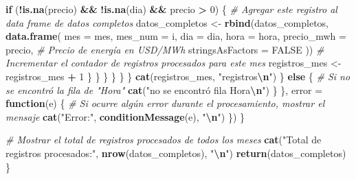 \documentclass[
]{article}
\newenvironment{Shaded}{\begin{snugshade}}{\end{snugshade}}
\newcommand{\AttributeTok}[1]{\textcolor[rgb]{0.13,0.29,0.53}{#1}}
\newcommand{\CommentTok}[1]{\textcolor[rgb]{0.56,0.35,0.01}{\textit{#1}}}
\newcommand{\ConstantTok}[1]{\textcolor[rgb]{0.56,0.35,0.01}{#1}}
\newcommand{\ControlFlowTok}[1]{\textcolor[rgb]{0.13,0.29,0.53}{\textbf{#1}}}
\newcommand{\DecValTok}[1]{\textcolor[rgb]{0.00,0.00,0.81}{#1}}
\newcommand{\FunctionTok}[1]{\textcolor[rgb]{0.13,0.29,0.53}{\textbf{#1}}}
\newcommand{\NormalTok}[1]{#1}
\newcommand{\OtherTok}[1]{\textcolor[rgb]{0.56,0.35,0.01}{#1}}
\newcommand{\SpecialCharTok}[1]{\textcolor[rgb]{0.81,0.36,0.00}{\textbf{#1}}}
\newcommand{\StringTok}[1]{\textcolor[rgb]{0.31,0.60,0.02}{#1}}
\begin{document}
\begin{Shaded}
\begin{Highlighting}[]
                  \ControlFlowTok{if}\NormalTok{ (}\SpecialCharTok{!}\FunctionTok{is.na}\NormalTok{(precio) }\SpecialCharTok{\&\&} \SpecialCharTok{!}\FunctionTok{is.na}\NormalTok{(dia) }\SpecialCharTok{\&\&}\NormalTok{ precio }\SpecialCharTok{\textgreater{}} \DecValTok{0}\NormalTok{) \{}
                    \CommentTok{\# Agregar este registro al data frame de datos completos}
\NormalTok{                    datos\_completos }\OtherTok{\textless{}{-}} \FunctionTok{rbind}\NormalTok{(datos\_completos, }\FunctionTok{data.frame}\NormalTok{(}
                      \AttributeTok{mes =}\NormalTok{ mes,              }
                      \AttributeTok{mes\_num =}\NormalTok{ i,            }
                      \AttributeTok{dia =}\NormalTok{ dia,              }
                      \AttributeTok{hora =}\NormalTok{ hora,            }
                      \AttributeTok{precio\_mwh =}\NormalTok{ precio,    }\CommentTok{\# Precio de energía en USD/MWh}
                      \AttributeTok{stringsAsFactors =} \ConstantTok{FALSE} 
\NormalTok{                    ))}
                    \CommentTok{\# Incrementar el contador de registros procesados para este mes}
\NormalTok{                    registros\_mes }\OtherTok{\textless{}{-}}\NormalTok{ registros\_mes }\SpecialCharTok{+} \DecValTok{1}
\NormalTok{                  \}}
\NormalTok{                \}}
\NormalTok{              \}}
\NormalTok{            \}}
\NormalTok{          \}}
\NormalTok{        \}}
        \FunctionTok{cat}\NormalTok{(registros\_mes, }\StringTok{"registros}\SpecialCharTok{\textbackslash{}n}\StringTok{"}\NormalTok{)}
\NormalTok{      \} }\ControlFlowTok{else}\NormalTok{ \{}
        \CommentTok{\# Si no se encontró la fila de "Hora"}
        \FunctionTok{cat}\NormalTok{(}\StringTok{"no se encontró fila \textquotesingle{}Hora\textquotesingle{}}\SpecialCharTok{\textbackslash{}n}\StringTok{"}\NormalTok{)}
\NormalTok{      \}}
\NormalTok{    \}, }\AttributeTok{error =} \ControlFlowTok{function}\NormalTok{(e) \{}
      \CommentTok{\# Si ocurre algún error durante el procesamiento, mostrar el mensaje}
      \FunctionTok{cat}\NormalTok{(}\StringTok{"Error:"}\NormalTok{, }\FunctionTok{conditionMessage}\NormalTok{(e), }\StringTok{"}\SpecialCharTok{\textbackslash{}n}\StringTok{"}\NormalTok{)}
\NormalTok{    \})}
\NormalTok{  \}}
  
  \CommentTok{\# Mostrar el total de registros procesados de todos los meses}
  \FunctionTok{cat}\NormalTok{(}\StringTok{"Total de registros procesados:"}\NormalTok{, }\FunctionTok{nrow}\NormalTok{(datos\_completos), }\StringTok{"}\SpecialCharTok{\textbackslash{}n}\StringTok{"}\NormalTok{)}
  \FunctionTok{return}\NormalTok{(datos\_completos)}
\NormalTok{\}}
\end{Highlighting}
\end{Shaded}
\end{document}
